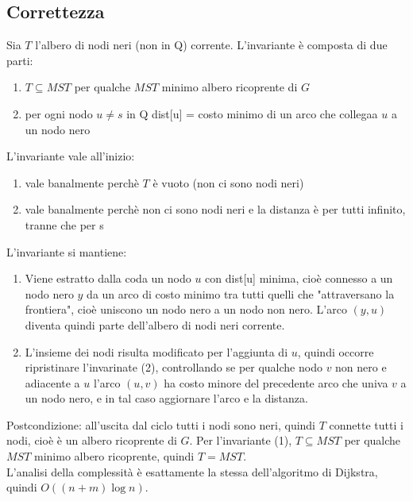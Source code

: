 \documentclass[12pt]{article}
\begin{document}
\subsection{Correttezza}
Sia $T$ l'albero di nodi neri (non in Q) corrente. L'invariante è composta di due parti:
\begin{enumerate}
    \item $T \subseteq MST$ per qualche $MST$ minimo albero ricoprente di $G$
    \item per ogni nodo $u\neq s$ in Q dist[u] = costo minimo di un arco che collegaa $u$ a un nodo nero
\end{enumerate}
L'invariante vale all'inizio:
\begin{enumerate}
    \item vale banalmente perchè $T$ è vuoto (non ci sono nodi neri)
    \item vale banalmente perchè non ci sono nodi neri e la distanza è  per tutti infinito, tranne che per s
\end{enumerate}
L'invariante si mantiene:
\begin{enumerate}
    \item Viene estratto dalla coda un nodo $u$ con dist[u] minima, cioè connesso a un nodo nero $y$ da un arco di costo minimo tra tutti quelli che "attraversano la frontiera", cioè uniscono un nodo nero a un nodo non nero. L'arco $(y,u)$ diventa quindi parte dell'albero di nodi neri corrente.
    \item L'insieme dei nodi risulta modificato per l'aggiunta di $u$, quindi occorre ripristinare l'invarinate (2), controllando se per qualche nodo $v$ non nero e adiacente a $u$ l'arco $(u,v)$ ha costo minore del precedente arco che univa $v$ a un nodo nero, e in tal caso aggiornare l'arco e la distanza.
\end{enumerate}
Postcondizione: all'uscita dal ciclo tutti i nodi sono neri, quindi $T$ connette tutti i nodi, cioè è un albero ricoprente di $G$. Per l'invariante (1), $T\subseteq MST$ per qualche $MST$ minimo albero ricoprente, quindi $T=MST$.\\
L'analisi della complessità è esattamente la stessa dell'algoritmo di Dijkstra, quindi $O((n+m)\log n)$.
\end{document}
